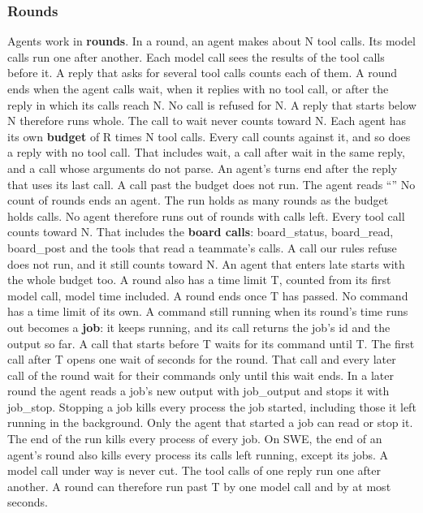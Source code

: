 \subsubsection*{Rounds}
Agents work in \textbf{rounds}.
In a round, an agent makes about N tool calls.
Its model calls run one after another.
Each model call sees the results of the tool calls before it.
A reply that asks for several tool calls counts each of them.
A round ends when the agent calls wait, when it replies with no tool call, or after the reply in which its calls
reach N.
No call is refused for N.
A reply that starts below N therefore runs whole.
The call to wait never counts toward N.
Each agent has its own \textbf{budget} of R times N tool calls.
Every call counts against it, and so does a reply with no tool call.
That includes wait, a call after wait in the same reply, and a call whose arguments do not parse.
An agent's turns end after the reply that uses its last call.
A call past the budget does not run.
The agent reads ``\NoCallsLeft''
No count of rounds ends an agent.
The run holds as many rounds as the budget holds calls.
No agent therefore runs out of rounds with calls left.
Every tool call counts toward N.
That includes the \textbf{board calls}: board\_status, board\_read, board\_post and the tools that read a
teammate's calls.
A call our rules refuse does not run, and it still counts toward N.
An agent that enters late starts with the whole budget too.
A round also has a time limit T, counted from its first model call, model time included.
A round ends once T has passed.
No command has a time limit of its own.
A command still running when its round's time runs out becomes a \textbf{job}: it keeps running, and its call returns
the job's id and the output so far.
A call that starts before T waits for its command until T.
The first call after T opens one wait of \LateStartSeconds{} seconds for the round.
That call and every later call of the round wait for their commands only until this wait ends.
In a later round the agent reads a job's new output with job\_output and stops it with job\_stop.
Stopping a job kills every process the job started, including those it left running in the background.
Only the agent that started a job can read or stop it.
The end of the run kills every process of every job.
On SWE, the end of an agent's round also kills every process its calls left running, except its jobs.
A model call under way is never cut.
The tool calls of one reply run one after another.
A round can therefore run past T by one model call and by at most \LateStartSeconds{} seconds.
